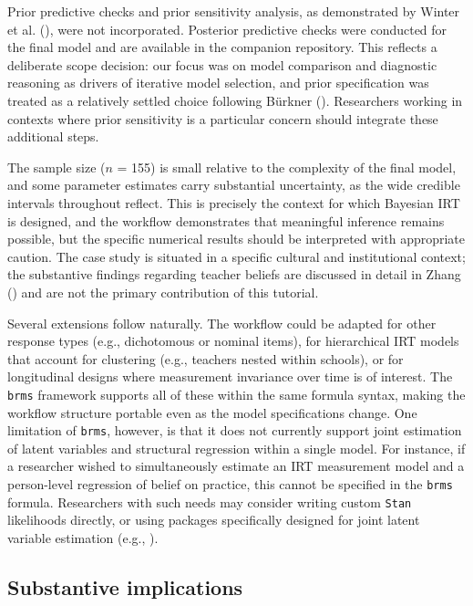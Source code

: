 \documentclass[
  man,
  floatsintext,
  longtable,
  nolmodern,
  notxfonts,
  notimes,
  colorlinks=true,linkcolor=blue,citecolor=blue,urlcolor=blue]{apa7}
\begin{document}
Prior predictive checks and prior sensitivity analysis, as demonstrated
by Winter et al. (), were not
incorporated. Posterior predictive checks were conducted for the final
model and are available in the companion repository. This reflects a
deliberate scope decision: our focus was on model comparison and
diagnostic reasoning as drivers of iterative model selection, and prior
specification was treated as a relatively settled choice following
Bürkner (). Researchers working in
contexts where prior sensitivity is a particular concern should
integrate these additional steps.

The sample size (\(n\) = 155) is small relative to the complexity of the
final model, and some parameter estimates carry substantial uncertainty,
as the wide credible intervals throughout reflect. This is precisely the
context for which Bayesian IRT is designed, and the workflow
demonstrates that meaningful inference remains possible, but the
specific numerical results should be interpreted with appropriate
caution. The case study is situated in a specific cultural and
institutional context; the substantive findings regarding teacher
beliefs are discussed in detail in Zhang
() and are not the primary
contribution of this tutorial.

Several extensions follow naturally. The workflow could be adapted for
other response types (e.g., dichotomous or nominal items), for
hierarchical IRT models that account for clustering (e.g., teachers
nested within schools), or for longitudinal designs where measurement
invariance over time is of interest. The \texttt{brms} framework
supports all of these within the same formula syntax, making the
workflow structure portable even as the model specifications change. One
limitation of \texttt{brms}, however, is that it does not currently
support joint estimation of latent variables and structural regression
within a single model. For instance, if a researcher wished to
simultaneously estimate an IRT measurement model and a person-level
regression of belief on practice, this cannot be specified in the
\texttt{brms} formula. Researchers with such needs may consider writing
custom \texttt{Stan} likelihoods directly, or using packages
specifically designed for joint latent variable estimation (e.g.,
).

\subsection{Substantive implications}\label{substantive-implications}
\end{document}
